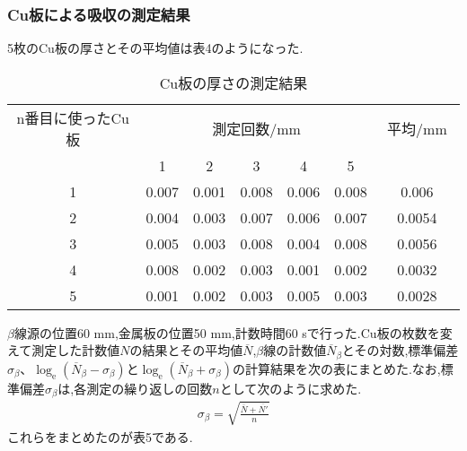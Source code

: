 \documentclass[a4j,10pt]{jarticle}
\begin{document}
    \subsubsection{Cu板による吸収の測定結果}
      5枚のCu板の厚さとその平均値は表4のようになった.
    \begin{table}[h]
      \label{Cuatusa}
      \begin{center}
      \caption{Cu板の厚さの測定結果}
        \begin{tabular}{ccccccc}
        \hline
        n番目に使ったCu板&\multicolumn{5}{c}{測定回数$/\mathrm{mm}$} & 平均$/\mathrm{mm}$　\\
          & 1 & 2 & 3 & 4 & 5 & \\ \hline
        1 & 0.007 & 0.001 & 0.008 & 0.006 & 0.008 & 0.006 \\
        2 & 0.004 & 0.003 & 0.007 & 0.006 & 0.007 & 0.0054\\
        3 & 0.005 & 0.003 & 0.008 & 0.004 & 0.008 & 0.0056\\
        4 & 0.008 & 0.002 & 0.003 & 0.001 & 0.002 & 0.0032\\
        5 & 0.001 & 0.002 & 0.003 & 0.005 & 0.003 & 0.0028\\
        \hline
        \end{tabular}
      \end{center}
    \end{table}
    $\beta$線源の位置60 mm,金属板の位置50 mm,計数時間60 sで行った.Cu板の枚数を変えて測定した計数値$N$の結果とその平均値$\overline{N}$,$\beta$線の計数値$\overline{N}_{\beta}$とその対数,標準偏差$\sigma_{\beta}$、$\log_{\mathrm{e}}(\overline{N}_{\beta}-\sigma_{\beta})$と$\log_{\mathrm{e}}(\overline{N}_{\beta}+\sigma_{\beta})$の計算結果を次の表にまとめた.なお,標準偏差$\sigma_{\beta}$は,各測定の繰り返しの回数$n$として次のように求めた.
    \begin{eqnarray}
      \sigma_{\beta} = \sqrt{\frac{\overline{N}+\overline{N'}}{n}}
    \end{eqnarray}
    これらをまとめたのが表5である.
\end{document}
